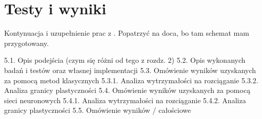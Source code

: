 \chapter{Testy i wyniki}
\label{cha5}

Kontynuacja i uzupełnienie prac z \cite{Reczek21}. 
Popatrzyć na doca, bo tam schemat mam przygotowany.

5.1. Opis podejścia (czym się różni od tego z rozdz. 2)
5.2. Opis wykonanych badań i testów oraz własnej implementacji
5.3. Omówienie wyników uzyskanych za pomocą metod klasycznych
5.3.1. Analiza wytrzymałości na rozciąganie
5.3.2. Analiza granicy plastyczności
5.4. Omówienie wyników uzyskanych za pomocą sieci neuronowych
5.4.1. Analiza wytrzymałości na rozciąganie
5.4.2. Analiza granicy plastyczności
5.5. Omówienie wyników / całościowe
